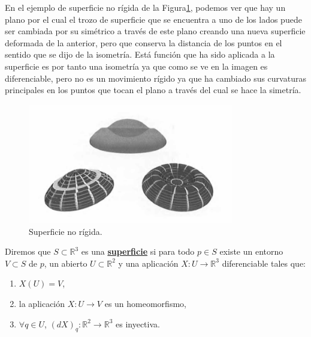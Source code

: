 En el ejemplo de superficie no rígida de la Figura\ref{fig:etiq_2}, podemos ver que hay un plano por el cual el trozo de superficie que se encuentra a uno de los lados puede ser cambiada por su simétrico a través de este plano creando una nueva superficie deformada de la anterior, pero que conserva la distancia de los puntos en el sentido que se dijo de la isometría. Está función que ha sido aplicada a la superficie es por tanto una isometría ya que como se ve en la imagen es diferenciable, pero no es un movimiento rígido ya que ha cambiado sus curvaturas principales en los puntos que tocan el plano a través del cual se hace la simetría.

\begin{figure}
	\begin{center}
		\includegraphics[width=0.8\textwidth]{imagenes/no_rigid}
	\end{center}
	\caption{Superficie no rígida.}
	\label{fig:etiq_2}
\end{figure}




\begin{definicion}
	Diremos que $S \subset \mathbb{R}^3$ es una \underline{\textbf{superficie}} si para todo $p \in S$ existe un entorno $V \subset S$ de $p$, un abierto $U \subset \mathbb{R}^2$ y una aplicación $X : U \to \mathbb{R}^3$ diferenciable tales que:
	\begin{enumerate}
		\item $X(U) = V$,
		\item la aplicación $X : U \to V$ es un homeomorfismo,
		\item $\forall q \in U$, $(dX)_q : \mathbb{R}^2 \to \mathbb{R}^3$ es inyectiva.
	\end{enumerate}
\end{definicion}
${ }$\\

